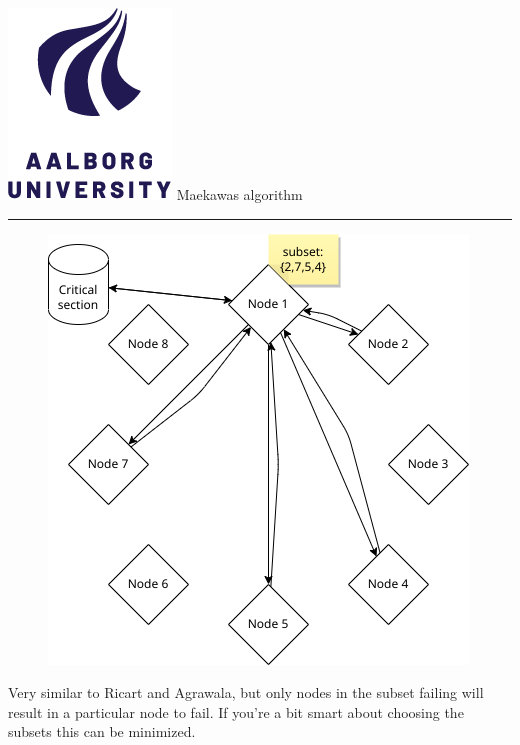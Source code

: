 \documentclass[aspectratio=1610,17pt,utf8]{beamer}
\newcommand{\regularframe}[1]{\color{black}\includegraphics[width=.05\textwidth]{figures/aau.png} #1\\\hrule}
\begin{document}
\begin{frame}{\regularframe{Maekawas algorithm}}
    \begin{minipage}{.45\textwidth}
        \begin{figure}
            \includegraphics[width=\textwidth]{figures/1-maekawa.png}
        \end{figure}
    \end{minipage}
    \begin{minipage}{.5\textwidth}
        \tiny{Very similar to Ricart and Agrawala, but only nodes in the subset failing will result in a particular node to fail. If you're a bit smart about choosing the subsets this can be minimized.}
    \end{minipage}
\end{frame}
\end{document}
